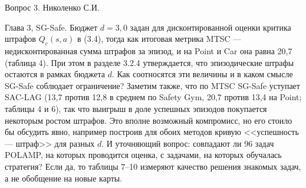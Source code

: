 \begin{frame}[noframenumbering]{Вопрос 3. Николенко С.И.}
    \begin{block}{}
        \footnotesize
        Глава 3, SG-Safe. Бюджет $d = 3{,}0$ задан для дисконтированной оценки
        критика штрафов $Q_c(s, a)$ в (3.4), тогда как итоговая метрика MTSC
        --- недисконтированная сумма штрафов за эпизод, и на Point и Car она
        равна 20,7 (таблица 4). При этом в разделе 3.2.4 утверждается, что
        эпизодические штрафы остаются в рамках бюджета $d$. Как соотносятся эти
        величины и в каком смысле SG-Safe соблюдает ограничение? Заметим также,
        что по MTSC SG-Safe уступает SAC-LAG (13,7 против 12,8 в среднем по
        Safety Gym, 20,7 против 13,4 на Point; таблицы 4 и 6), так что выигрыш в
        доле успешных эпизодов покупается некоторым ростом штрафов. Это вполне
        возможный компромисс, но его стоило бы обсудить явно, например построив
        для обоих методов кривую <<успешность --- штраф>> для разных $d$. И
        уточняющий вопрос: совпадают ли 96 задач POLAMP, на которых проводится
        оценка, с задачами, на которых обучалась стратегия? Если да, то таблицы
        7--10 измеряют качество решения знакомых задач, а не обобщение на новые
        карты.
    \end{block}
\end{frame}

